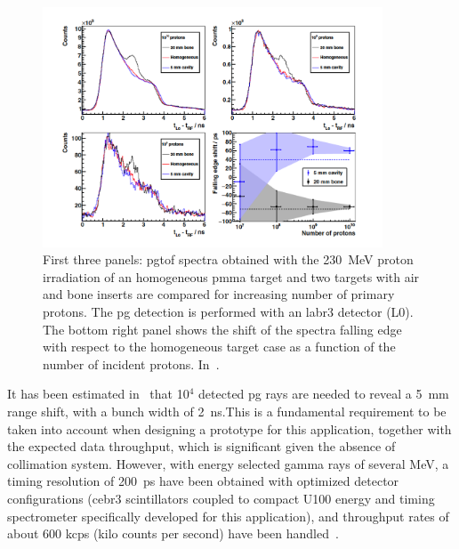 \begin{figure}[!htbp]
\centering
\includegraphics[width=0.9\textwidth]{03_GraphicFiles/chapter2_GammaCameras/PGT_stats.pdf}
\caption{First three panels: \gls{pg}\gls{tof} spectra obtained with the 230~MeV proton irradiation of an homogeneous \gls{pmma} target and two targets with air and bone inserts are compared for increasing number of primary protons. The \gls{pg} detection is performed with an \gls{labr3} detector (L0). The bottom right panel shows the shift of the spectra falling edge with respect to the homogeneous target case as a function of the number of incident protons. In~\cite{HuesoGonzalez2015b}.}
\label{chap2::fig::PGT_stats}
\end{figure}  

It has been estimated in~\cite{Pausch2016} that 10$^4$ detected \gls{pg} rays are needed to reveal a 5~mm range shift, with a bunch width of 2~ns.This is a fundamental requirement to be taken into account when designing a prototype for this application, together with the expected data throughput, which is significant given the absence of collimation system. However, with energy selected gamma rays of several MeV, a timing resolution of 200~ps have been obtained with optimized detector configurations (\gls{cebr3} scintillators coupled to compact U100 energy and timing spectrometer specifically developed for this application), and throughput rates of about 600 kcps (kilo counts per second) have been handled~\cite{Pausch2016}. 

